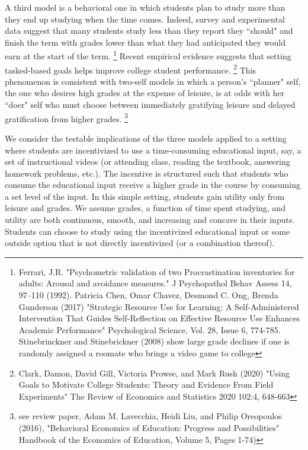 \documentclass[12pt]{article}
\begin{document}
A third model is a behavioral one in which students plan to study more than they end up studying when the time comes. Indeed, survey and experimental data suggest that many students study less than they report they ``should" and finish the term with grades lower than what they had anticipated they would earn at the start of the term.%
\footnote{Ferrari, J.R. "Psychometric validation of two Procrastination inventories for adults: Arousal and avoidance measures." J Psychopathol Behav Assess 14, 97–110 (1992). Patricia Chen, Omar Chavez, Desmond C. Ong, Brenda Gunderson (2017) "Strategic Resource Use for Learning: A Self-Administered Intervention That Guides Self-Reflection on Effective Resource Use Enhances Academic Performance" Psychological Science, Vol. 28, Issue 6, 774-785. Stinebrinckner and Stinebrickner (2008) show large grade declines if one is randomly assigned a roomate who brings a video game to college} Recent empirical evidence suggests that setting tasked-based goals helps improve college student performance.%
\footnote{Clark, Damon, David Gill, Victoria Prowse, and Mark Rush (2020) "Using Goals to Motivate College Students: Theory and Evidence From Field Experiments" The Review of Economics and Statistics 2020 102:4, 648-663} This phenomenon is consistent with two-self models in which a person's ``planner" self, the one who desires high grades at the expense of leisure, is at odds with her ``doer" self who must choose between immediately gratifying leisure and delayed gratification from higher grades.%
\footnote{see review paper, Adam M. Lavecchia, Heidi Liu, and Philip Oreopoulos (2016), "Behavioral Economics of Education: Progress and Possibilities" Handbook of the Economics of Education, Volume 5, Pages 1-74)}

We consider the testable implications of the three models applied to a setting where students are incentivized to use a time-consuming educational input, say, a set of instructional videos (or attending class, reading the textbook, answering homework problems, etc.). The incentive is structured such that students who consume the educational input receive a higher grade in the course by consuming a set level of the input. In this simple setting, students gain utility only from leisure and grades. We assume grades, a function of time spent studying, and utility are both continuous, smooth, and increasing and concave in their inputs. Students can choose to study using the incentivized educational input or some outside option that is not directly incentivized (or a combination thereof).
\end{document}
